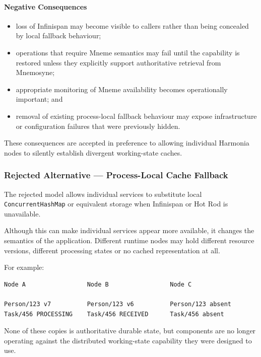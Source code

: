 \paragraph{Negative Consequences}

\begin{itemize}
    \item loss of Infinispan may become visible to callers rather than being concealed by local fallback behaviour;
    \item operations that require Mneme semantics may fail until the capability is restored unless they explicitly support authoritative retrieval from Mnemosyne;
    \item appropriate monitoring of Mneme availability becomes operationally important; and
    \item removal of existing process-local fallback behaviour may expose infrastructure or configuration failures that were previously hidden.
\end{itemize}

These consequences are accepted in preference to allowing individual Harmonia nodes to silently establish divergent working-state caches.

\subsubsection{Rejected Alternative --- Process-Local Cache Fallback}

The rejected model allows individual services to substitute local \texttt{ConcurrentHashMap} or equivalent storage when Infinispan or Hot Rod is unavailable.

Although this can make individual services appear more available, it changes the semantics of the application. Different runtime nodes may hold different resource versions, different processing states or no cached representation at all.

For example:

\begin{verbatim}
Node A                 Node B                 Node C

Person/123 v7          Person/123 v6          Person/123 absent
Task/456 PROCESSING    Task/456 RECEIVED      Task/456 absent
\end{verbatim}

None of these copies is authoritative durable state, but components are no longer operating against the distributed working-state capability they were designed to use.

